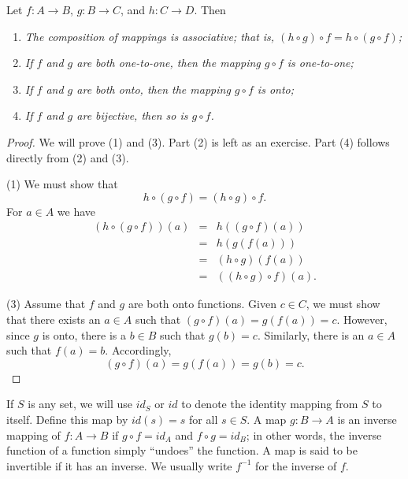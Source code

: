 \begin{theorem}\label{sets_theorem_3}
Let $f : A \rightarrow B$, $g : B \rightarrow C$, and $h : C \rightarrow D$. Then  
\begin{enumerate}
 
\rm \item \it
The composition of mappings is associative; that is, $(h \circ g) \circ f = h \circ (g \circ f)$;  
 
\rm \item \it
If $f$ and $g$ are both one-to-one, then the mapping $g \circ f$ is one-to-one; 
 
\rm \item \it
If $f$ and $g$ are both onto, then the mapping $g \circ f$ is onto;  
 
\rm \item \it
If $f$ and $g$ are bijective, then so is $g \circ f$.
 
\end{enumerate}
\end{theorem}
 
\begin{proof}
We will prove (1) and (3). Part (2) is left as an exercise.  Part (4) follows directly from (2) and (3). 
 
(1) 
We must show that
$$
h \circ (g \circ f) = (h \circ g) \circ f.
$$
For $a \in A$ we have
\begin{eqnarray*}
(h \circ (g \circ f))(a) & = & h((g \circ f)(a)) \\
& = & h(g(f(a)))  \\
& = & (h \circ g)(f(a)) \\
& = & ((h \circ g) \circ f)(a).
\end{eqnarray*}
 
(3) 
Assume that $f$ and $g$ are both onto functions.  Given $c \in C$, we must show that there exists an $a \in A$ such that $(g \circ f)(a) = g(f(a)) = c$.  However, since $g$ is onto, there is a $b \in B$ such that $g(b) = c$.  Similarly, there is an $a \in A$ such that $f(a) = b$.  Accordingly, 
$$
(g \circ f)(a) = g(f(a)) = g(b) = c.
$$
\end{proof}
 
\medskip
 
If $S$ is any set, we will use $id_S$ or $id$\label{noteidentity} to denote the {\bfi identity mapping\/} from $S$ to itself.  Define this map by $id(s) = s$ for all $s \in S$.  A map $g: B \rightarrow A$ is an {\bfi inverse mapping\/} of $f: A \rightarrow B$ if $g \circ f = id_A$ and $f \circ g = id_B$; in other words, the inverse function of a function simply ``undoes'' the function.   A map is said to be {\bfi invertible\/} if it has an inverse.  We usually write $f^{-1}$\label{inversefunc} for the inverse of $f$.  

